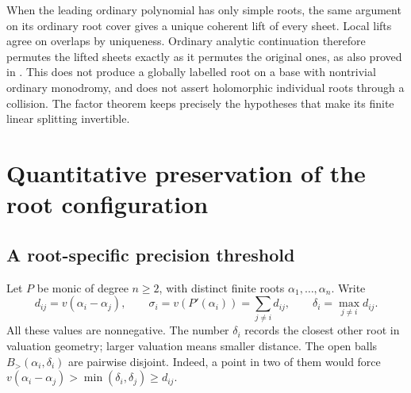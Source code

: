 \documentclass[11pt,letterpaper]{article}
\numberwithin{equation}{section}
\theoremstyle{definition}
\theoremstyle{remark}
\newcommand{\Bgt}[2]{B_{>}(#1,#2)}
\begin{document}
When the leading ordinary polynomial has only simple roots, the same
argument on its ordinary root cover gives a unique coherent lift of every
sheet. Local lifts agree on overlaps by uniqueness. Ordinary analytic
continuation therefore permutes the lifted sheets exactly as it permutes
the original ones, as also proved in \cite{SourceResearch}. This does not
produce a globally labelled root on a base with nontrivial ordinary
monodromy, and does not assert holomorphic individual roots through a
collision. The factor theorem keeps precisely the hypotheses that make
its finite linear splitting invertible.

\section{Quantitative preservation of the root configuration}\label{sec:stability}

\subsection{A root-specific precision threshold}
Let $P$ be monic of degree $n\ge2$, with distinct finite roots
$\alpha_1,\ldots,\alpha_n$. Write
\begin{equation}\label{eq:stabilitydata}
 d_{ij}=v(\alpha_i-\alpha_j),\qquad
 \sigma_i=v(P'(\alpha_i))=\sum_{j\ne i}d_{ij},\qquad
 \delta_i=\max_{j\ne i}d_{ij}.
\end{equation}
All these values are nonnegative. The number $\delta_i$ records the
closest other root in valuation geometry; larger valuation means smaller
distance. The open balls $\Bgt{\alpha_i}{\delta_i}$ are pairwise disjoint.
Indeed, a point in two of them would force
$v(\alpha_i-\alpha_j)>\min(\delta_i,\delta_j)\ge d_{ij}$.
\end{document}
